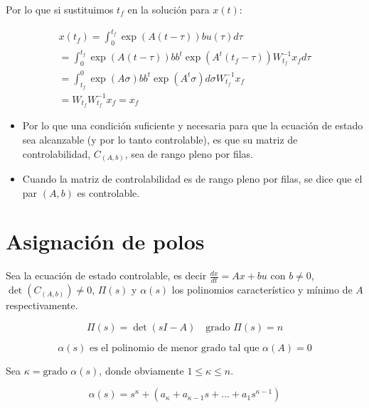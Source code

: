         Por lo que si sustituimos $t_f$ en la solución para $x(t)$:

        \begin{multline}
            x(t_f) = \int_0^{t_f} \exp{(A(t - \tau))} b u(\tau) d\tau \\
                   = \int_0^{t_f} \exp{(A(t - \tau))} b b^t \exp{(A^t(t_f - \tau))} W_{t_f}^{-1} x_f d\tau \\
                   = \int_{t_f}^0 \exp{(A \sigma)} b b^t \exp{(A^t \sigma)} d\sigma W_{t_f}^{-1} x_f \\
                   = W_{t_f} W_{t_f}^{-1} x_f = x_f
        \end{multline}

        \begin{itemize}
            \item Por lo que una condición suficiente y necesaria para que la ecuación de estado sea alcanzable (y por lo tanto controlable), es que su matriz de controlabilidad, $C_{(A,b)}$, sea de rango pleno por filas.
            \item Cuando la matriz de controlabilidad es de rango pleno por filas, se dice que el par $(A, b)$ es controlable.
        \end{itemize}

    \section{Asignación de polos}

        Sea la ecuación de estado controlable, es decir $\frac{dx}{dt} = Ax + bu$ con $b \ne 0$, $\det{(C_{(A,b)})} \ne 0$, $\Pi(s)$ y $\alpha(s)$ los polinomios característico y mínimo de $A$ respectivamente.

        \begin{equation}
            \Pi(s) = \det{(sI - A)} \quad \text{grado } \Pi(s) = n \nonumber
        \end{equation}

        \begin{equation}
            \alpha(s) \text{ es el polinomio de menor grado tal que } \alpha(A) = 0 \nonumber
        \end{equation}

        Sea $\kappa = \text{grado } \alpha(s)$, donde obviamente $1 \le \kappa \le n$.

        \begin{equation}
            \alpha(s) = s^{\kappa} + (a_{\kappa} + a_{\kappa - 1} s + \dots + a_1 s^{\kappa - 1}) \nonumber
        \end{equation}

